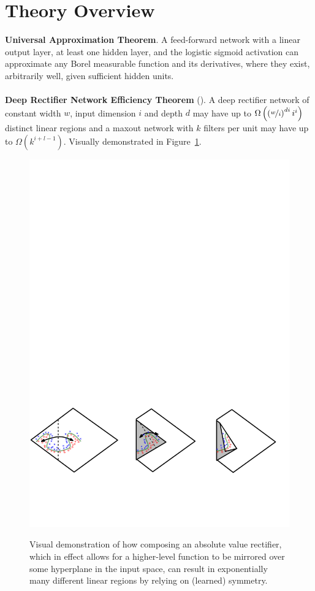 \documentclass{article}
\begin{document}
\section{Theory Overview}

\noindent
\textbf{Universal Approximation Theorem}. A feed-forward network with a linear output layer, at least one hidden layer, and the logistic sigmoid activation can approximate any Borel measurable function and its derivatives, where they exist, arbitrarily well, given sufficient hidden units.
\\\\
\noindent
\textbf{Deep Rectifier Network Efficiency Theorem} (). A deep rectifier network of constant width $w$, input dimension $i$ and depth $d$ may have up to $\Omega\left({\left({\nicefrac{w}{i}}\right)^{di}i^i}\right)$ distinct linear regions and a maxout network with $k$ filters per unit may have up to $\Omega(k^{i+l-1})$. Visually demonstrated in Figure~\ref{fig:montufar}.

\begin{figure}[!h]
\centering
{\includegraphics[width=\textwidth]{montufar2014.pdf}}
  \caption{Visual demonstration of how composing an absolute value rectifier, which in effect allows for a higher-level function to be mirrored over some hyperplane in the input space, can result in exponentially many different linear regions by relying on (learned) symmetry.}
\label{fig:montufar}
\end{figure}
\end{document}

